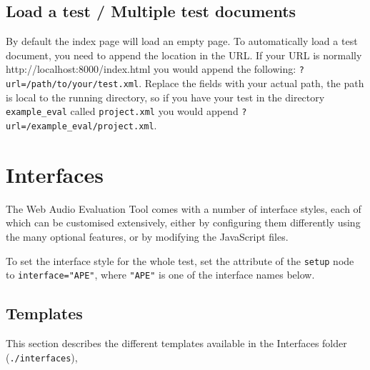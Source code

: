 \documentclass[11pt, oneside]{article}   	%
\begin{document}
    \subsection{Load a test / Multiple test documents}
        By default the index page will load an empty page. To automatically load a test document, you need to append the location in the URL. If your URL is normally http://localhost:8000/index.html you would append the following: \texttt{?url=/path/to/your/test.xml}. Replace the fields with your actual path, the path is local to the running directory, so if you have your test in the directory \texttt{example\_eval} called \texttt{project.xml} you would append \texttt{?url=/example\_eval/project.xml}.

\clearpage

\section{Interfaces}

	The Web Audio Evaluation Tool comes with a number of interface styles, each of which can be customised extensively, either by configuring them differently using the many optional features, or by modifying the JavaScript files. 

	To set the interface style for the whole test, set the attribute of the \texttt{setup} node to \texttt{interface="APE"}, where \texttt{"APE"} is one of the interface names below. 

	\subsection{Templates}
		This section describes the different templates available in the Interfaces folder (\texttt{./interfaces}), 
\end{document}
